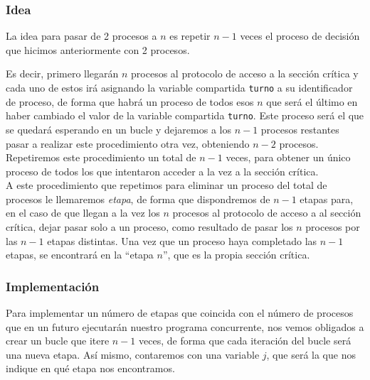 \subsubsection{Idea}
La idea para pasar de 2 procesos a $n$ es repetir $n-1$ veces el proceso de decisión que hicimos anteriormente con 2 procesos. 

Es decir, primero llegarán $n$ procesos al protocolo de acceso a la sección crítica y cada uno de estos irá asignando la variable compartida \verb|turno| a su identificador de proceso, de forma que habrá un proceso de todos esos $n$ que será el último en haber cambiado el valor de la variable compartida \verb|turno|. Este proceso será el que se quedará esperando en un bucle y dejaremos a los $n-1$ procesos restantes pasar a realizar este procedimiento otra vez, obteniendo $n-2$ procesos. Repetiremos este procedimiento un total de $n-1$ veces, para obtener un único proceso de todos los que intentaron acceder a la vez a la sección crítica.\\

A este procedimiento que repetimos para eliminar un proceso del total de procesos le llemaremos \textit{etapa}, de forma que dispondremos de $n-1$ etapas para, en el caso de que llegan a la vez los $n$ procesos al protocolo de acceso a al sección crítica, dejar pasar solo a un proceso, como resultado de pasar los $n$ procesos por las $n-1$ etapas distintas. Una vez que un proceso haya completado las $n-1$ etapas, se encontrará en la ``etapa $n$'', que es la propia sección crítica.

\subsubsection{Implementación}
Para implementar un número de etapas que coincida con el número de procesos que en un futuro ejecutarán nuestro programa concurrente, nos vemos obligados a crear un bucle que itere $n-1$ veces, de forma que cada iteración del bucle será una nueva etapa. Así mismo, contaremos con una variable $j$, que será la que nos indique en qué etapa nos encontramos.

